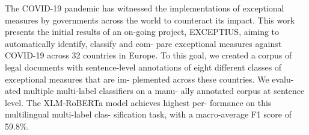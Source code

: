 The COVID-19 pandemic has witnessed the implementations of exceptional measures by governments across the world to counteract its impact. This work presents the initial results of an on-going project, EXCEPTIUS, aiming to automatically identify, classify and com- pare exceptional measures against COVID-19 across 32 countries in Europe. To this goal, we created a corpus of legal documents with sentence-level annotations of eight different classes of exceptional measures that are im- plemented across these countries. We evalu- ated multiple multi-label classifiers on a manu- ally annotated corpus at sentence level. The XLM-RoBERTa model achieves highest per- formance on this multilingual multi-label clas- sification task, with a macro-average F1 score of 59.8\%.
